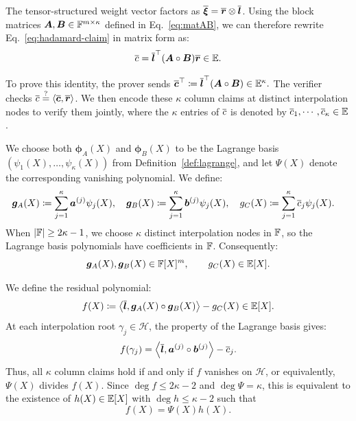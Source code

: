 The tensor-structured weight vector factors as
\(\overline{\bm\xi}=\overline{\bm r}\mathbin{\otimes}\overline{\bm l}\).
Using the block matrices
\(\bm A,\bm B\in{\mathbb{F}}^{m\times\kappa}\)
defined in Eq.~\eqref{eq:matAB}, we can therefore rewrite
Eq.~\eqref{eq:hadamard-claim} in matrix form as:
\[
    \overline{c}
    =
    \overline{\bm l}^{\top}
    (\bm A\circ\bm B)
    \overline{\bm r}
    \in\mathbb{E}.
\]

To prove this identity, the prover sends
\(
    \overline{\bm c}^{\top}
    \coloneqq
    \overline{\bm l}^{\top}(\bm A\circ\bm B) \in \mathbb{E}^\kappa.
\)
The verifier checks
\(\overline{c}\mathrel{\overset{\mathrm{?}}{=}}
\langle\overline{\bm c},\overline{\bm r}\rangle\).
We then encode these \(\kappa\) column claims at distinct
interpolation nodes to verify them jointly,
where the $\kappa$ entries of $\overline{c}$ is denoted by $\overline{c}_1, \cdots, \overline{c}_\kappa \in \mathbb{E}$.

We choose both \(\bm{\phi}_A(X)\) and \(\bm{\phi}_B(X)\)
to be the Lagrange basis
\((\psi_1(X),\ldots,\psi_\kappa(X))\)
from Definition~\ref{def:lagrange}, and let \(\Psi(X)\)
denote the corresponding vanishing polynomial.
We define:
\[
\begin{aligned}
    \bm g_A(X)
    &\coloneqq
    \sum_{j=1}^{\kappa}
    \bm a^{(j)}\psi_j(X),
    \quad
    \bm g_B(X)
    \coloneqq
    \sum_{j=1}^{\kappa}
    \bm b^{(j)}\psi_j(X),
    \quad
    g_C(X)
    \coloneqq
    \sum_{j=1}^{\kappa}
    \overline{c}_j\psi_j(X).
\end{aligned}
\]
When \(|{\mathbb{F}}|\ge 2\kappa-1\), we choose \(\kappa\) distinct
interpolation nodes in \({\mathbb{F}}\), so the Lagrange basis
polynomials have coefficients in \({\mathbb{F}}\).
Consequently:
\[
    \bm g_A(X),\bm g_B(X)\in{\mathbb{F}}[X]^m,
    \qquad
    g_C(X)\in\mathbb{E}[X].
\]

We define the residual polynomial:
\[
    f(X)
    \coloneqq
    \left\langle
        \overline{\bm l},
        \bm g_A(X)\circ\bm g_B(X)
    \right\rangle
    -
    g_C(X)
    \in\mathbb{E}[X].
\]
At each interpolation root \(\gamma_j\in\mathcal H\),
the property of the Lagrange basis gives:
\[
    f(\gamma_j)
    =
    \left\langle
        \overline{\bm l},
        \bm a^{(j)}\circ\bm b^{(j)}
    \right\rangle
    -
    \overline{c}_j.
\]
Thus, all \(\kappa\) column claims hold if and only if
\(f\) vanishes on \(\mathcal H\), or equivalently,
\(\Psi(X)\) divides \(f(X)\).
Since \(\deg f\le 2\kappa-2\) and \(\deg\Psi=\kappa\),
this is equivalent to the existence of
\(h(X)\in\mathbb{E}[X]\) with \(\deg h\le\kappa-2\)
such that
\begin{equation}
    f(X)=\Psi(X)h(X).
\label{eq:hadamard-quotient}
\end{equation}

